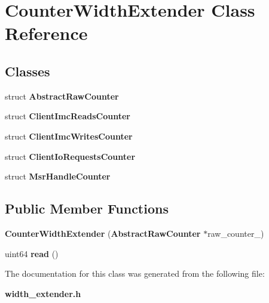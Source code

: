 \section{Counter\+Width\+Extender Class Reference}
\label{classCounterWidthExtender}
\subsection*{Classes}
\begin{DoxyCompactItemize}
\item 
struct {\bf Abstract\+Raw\+Counter}
\item 
struct {\bf Client\+Imc\+Reads\+Counter}
\item 
struct {\bf Client\+Imc\+Writes\+Counter}
\item 
struct {\bf Client\+Io\+Requests\+Counter}
\item 
struct {\bf Msr\+Handle\+Counter}
\end{DoxyCompactItemize}
\subsection*{Public Member Functions}
\begin{DoxyCompactItemize}
\item 
{\bfseries Counter\+Width\+Extender} ({\bf Abstract\+Raw\+Counter} $\ast$raw\+\_\+counter\+\_\+)\label{classCounterWidthExtender_a83aee7cbf9ba3f019181e025a953faf8}

\item 
uint64 {\bfseries read} ()\label{classCounterWidthExtender_a481ee1b6002b489711f7c8f2e17729f3}

\end{DoxyCompactItemize}


The documentation for this class was generated from the following file\+:\begin{DoxyCompactItemize}
\item 
{\bf width\+\_\+extender.\+h}\end{DoxyCompactItemize}
